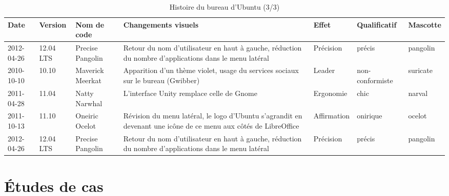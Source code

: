 \documentclass{FramateX}
\begin{document}
\begin{refsection}
\begin{landscape}
\begin{table}
\centering
\begin{scriptsize}
\begin{tabularx}{15cm}{|p{1.5cm}|p{1cm}|p{1.5cm}|X|p{2cm}|p{2cm}|p{1.5cm}|}
\hline
\textbf{Date} &  \textbf{Version}  & \textbf{Nom de code}  & \textbf{Changements visuels}  &  \textbf{Effet}  &  \textbf{Qualificatif}  & \textbf{Mascotte} \\
\hline
 2012-04-26  &  12.04 LTS  &  Precise Pangolin  & Retour du nom d'utilisateur en haut à gauche, réduction du nombre d'applications dans le menu latéral  &
 Précision  &  précis  & pangolin \\
\hline
 2010-10-10  &  10.10  &  Maverick Meerkat  & Apparition d'un thème violet, usage du services sociaux sur le bureau (Gwibber)  &  Leader  & non-conformiste  & suricate \\
\hline
 2011-04-28  &  11.04  &  Natty Narwhal  & L'interface Unity remplace celle de Gnome  &  Ergonomie  &  chic  & narval \\
\hline
 2011-10-13  &  11.10  &  Oneiric Ocelot  & Révision du menu latéral, le logo d'Ubuntu s'agrandit en devenant une icône de ce menu aux côtés de LibreOffice  &
 Affirmation  &  onirique  & ocelot \\
\hline
 2012-04-26  &  12.04 LTS  &  Precise Pangolin  & Retour du nom d'utilisateur en haut à gauche, réduction du nombre d'applications dans le menu latéral  &
 Précision  &  précis  & pangolin \\
\hline

\end{tabularx}
\end{scriptsize}
\caption{Histoire du bureau d'Ubuntu (3/3)}
\end{table}
\end{landscape}




\printbibliography[heading=subbibliography]
\end{refsection}
 
%
%
\part{Études de cas}
%
%
\end{document}
